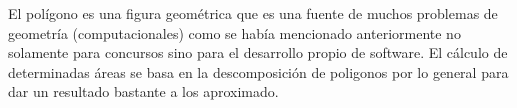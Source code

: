 El polígono es una figura geométrica que es una fuente de muchos problemas de geometría (computacionales) como se había mencionado anteriormente no solamente para concursos sino para el desarrollo propio de software. El cálculo de determinadas áreas se basa en la descomposición de poligonos por lo general para dar un resultado bastante a los aproximado. 